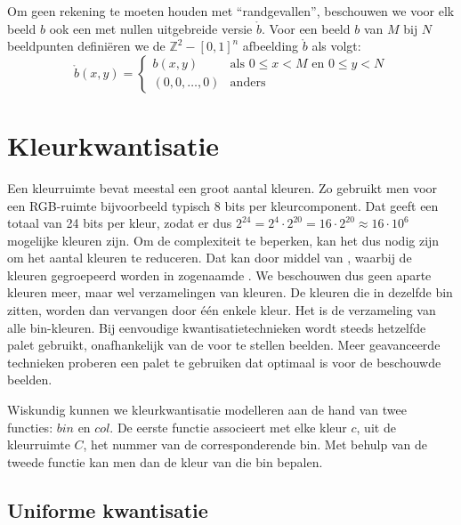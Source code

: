Om geen rekening te moeten houden met ``randgevallen'', beschouwen we voor elk beeld $b$ ook een
met nullen uitgebreide versie $\mathring{b}$. Voor een beeld $b$ van $M$ bij $N$ beeldpunten
defini\"eren we de $\mathbb{Z}^2 - [0,1]^n$ afbeelding $\mathring{b}$ als volgt:
\begin{displaymath}
\mathring{b}(x,y) = \begin{cases}
b(x,y) & \textrm{als } 0 \le x < M \textrm{ en } 0 \le y < N \\
(0,0,\ldots,0) & \textrm{anders}
\end{cases}
\end{displaymath}

\section{Kleurkwantisatie}
\label{sectie:kleurkwantisatie}

Een kleurruimte bevat meestal een groot aantal 
kleuren. Zo gebruikt men voor een RGB-ruimte bijvoorbeeld typisch 8 bits per 
kleurcomponent. Dat geeft een totaal van 24 bits per kleur, zodat er dus
$2^{24}=2^4 \cdot 2^{20}=16 \cdot 2^{20} \approx 16 \cdot 10^6$ mogelijke kleuren zijn.
Om de complexiteit te beperken, kan het dus nodig zijn om het aantal kleuren te 
reduceren. Dat kan door middel van , waarbij de kleuren 
gegroepeerd worden in
zogenaamde . We beschouwen dus geen aparte kleuren meer, maar wel 
verzamelingen van kleuren. De kleuren die in dezelfde bin zitten, worden dan 
vervangen door \'e\'en enkele kleur. Het  is de verzameling 
van alle bin-kleuren. Bij eenvoudige kwantisatietechnieken wordt steeds 
hetzelfde palet gebruikt, onafhankelijk van de voor te stellen beelden. Meer 
geavanceerde technieken proberen een palet te gebruiken dat optimaal is voor de 
beschouwde beelden.

Wiskundig kunnen we kleurkwantisatie modelleren aan de hand van twee functies: 
$bin$ en $col$. De eerste functie associeert met elke kleur $c$, uit de 
kleurruimte $C$, het nummer van de corresponderende bin. Met behulp van de 
tweede functie kan men dan de kleur van die bin bepalen.

\subsection{Uniforme kwantisatie}

